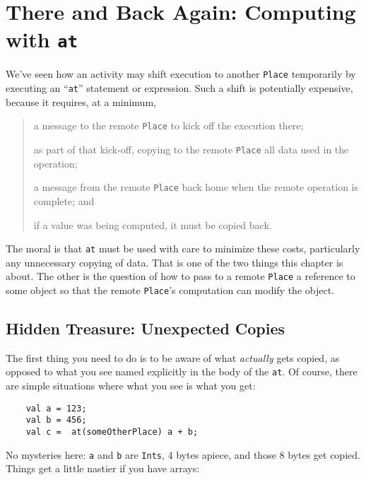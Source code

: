 
\chapter{There and Back Again: Computing with {\tt at}}

We've seen how an activity may shift execution to another {\tt Place}
temporarily by executing an ``{\tt at}'' statement or expression.  Such a shift
is potentially expensive, because it requires, at a minimum,
\begin{quote}
a message to the remote {\tt Place} to kick off the execution there;

as part of that kick-off, copying to the remote {\tt Place} all data used in the
operation;

a message from the remote {\tt Place} back home when the remote operation is
complete; and

if a value was being computed, it must be copied back.
\end{quote}

The moral is that {\tt at} must be used with care to minimize these costs,
particularly any unnecessary copying of data.  That is one of the two things
this chapter is about.  The other is the question of how
to pass to a remote {\tt Place} a reference to some object so that the
remote {\tt Place}'s computation can modify the object.

\section{Hidden Treasure: Unexpected Copies}\label{sec:hidden-treasure}

The first thing you need to do is to be aware of what {\em actually} gets
copied, as opposed to what you see named explicitly in the body of the {\tt at}.
Of course, there are simple situations where what you see is what you get:
\begin{verbatim}
    val a = 123;
    val b = 456;
    val c =  at(someOtherPlace) a + b;
\end{verbatim}
No mysteries here: {\tt a} and {\tt b} are {\tt Ints}, 4 bytes apiece, and those
8 bytes get copied.  Things get a little nastier if you have arrays:

